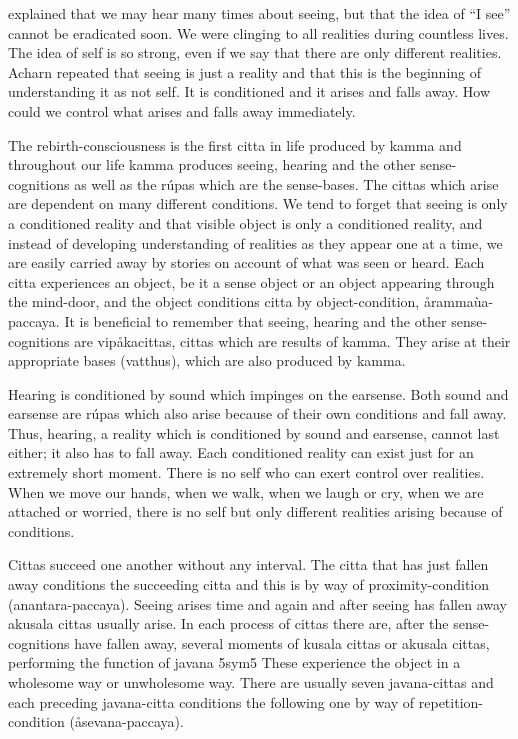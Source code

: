 \documentclass[10pt,a4paper,final]{article}
\begin{document}
\textportugueseAcharn explained that we
may hear many times about seeing, but that the idea of ``I see'' cannot
be eradicated soon. We were clinging to all realities during countless
lives. The idea of self is so strong,
even if we say that there are only different realities.
Acharn repeated that seeing is just a reality and that this
is the beginning of understanding it as not self. It is conditioned and
it arises and falls away. How could we control what arises and falls
away immediately. 

The rebirth-consciousness is the first citta
in life produced by kamma and throughout our life kamma produces seeing,
hearing and the other sense-cognitions as well as the rúpas which are
the sense-bases. The cittas which arise
are dependent on many different conditions. We tend to forget that
seeing is only a conditioned reality and that visible object is only a
conditioned reality, and instead of developing understanding
of realities as they appear one at a time,
we are easily carried away
by stories on account of what was seen or heard.
Each citta experiences an object, be it
a sense object or an object
appearing through the mind-door, and the
object conditions citta by object-condition,
årammaùa-paccaya. It is
beneficial to remember that seeing, hearing and the other
sense-cognitions are
vipåkacittas, cittas which
are results of kamma. They arise at their appropriate bases
(vatthus),
which are also produced by kamma. 

Hearing is conditioned
by sound which impinges on the earsense. Both sound and earsense are
rúpas which also arise
because of their own conditions and fall away. Thus, hearing,
a reality which
is conditioned by sound and earsense,
cannot last either; it also has to fall away. Each conditioned reality
can exist just for an extremely short moment.
There is no self who can
exert control over realities. When we move our hands, when we walk, when
we laugh or cry, when we are attached or worried, there is
no self but only different realities arising because of conditions.

Cittas succeed one
another without any interval. The citta that has just fallen away
conditions the succeeding citta and this is by way of
proximity-condition
(anantara-paccaya). Seeing
arises time and again and after seeing has fallen away akusala cittas
usually arise. In each process of cittas there are, after the
sense-cognitions have fallen away, several moments of kusala cittas or
akusala cittas, performing the function of javana
\protect\hyperlinksdfootnote5sym5
These experience the object in a wholesome way or unwholesome way. There
are usually seven javana-cittas and each preceding javana-citta
conditions the following one by way of repetition-condition
(åsevana-paccaya).
\end{document}
